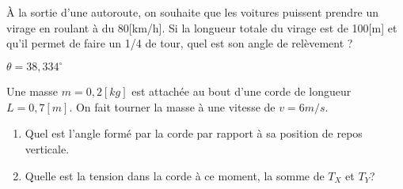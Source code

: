 \begin{exercise}
    À la sortie d'une autoroute, on souhaite que les voitures puissent prendre un virage en roulant à du 80[km/h]. Si la longueur totale du virage est de 100[m] et qu'il permet de faire un 1/4 de tour, quel est son angle de relèvement ?
\end{exercise}
\begin{solution}
    \(\theta=38,334 ^{\circ}\)
\end{solution}

\begin{exercise}
    Une masse \(m=0,2[kg]\) est attachée au bout d'une corde de longueur \(L=0,7[m]\). On fait tourner la masse à une vitesse de \(v=6m/s\).
    \begin{enumerate}[a]
        \item Quel est l'angle formé par la corde par rapport à sa position de repos verticale.
        \item Quelle est la tension dans la corde à ce moment, la somme de \(T_X\) et \(T_Y\)?
    \end{enumerate}
\end{exercise}
\begin{solution}

\end{solution}
